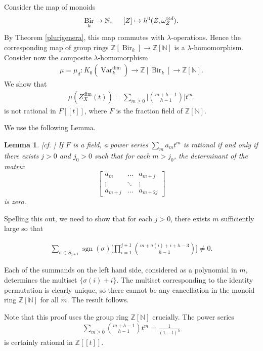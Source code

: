 \documentclass{amsart}
\newtheorem{lem}[thm]{Lemma}
\theoremstyle{definition}
\DeclareMathOperator{\sgn}{sgn}
\DeclareMathOperator{\Bir}{Bir}
\DeclareMathOperator{\Var}{Var}
\numberwithin{equation}{section}
\begin{document}
Consider the map of monoids 
\begin{align*}
   \Bir_k \rightarrow \mathbb{N}, \hspace{.5cm} [Z] \mapsto h^0(Z, \omega_Z^{\otimes d}).
\end{align*}
By Theorem \ref{plurigenera}, this map commutes with $\lambda$-operations. Hence the corresponding map of group rings $\mathbb{Z}[\Bir_k] \rightarrow \mathbb{Z}[\mathbb{N}]$ is a $\lambda$-homomorphism. Consider now the composite $\lambda$-homomorphism
\begin{align*}
\mu = \mu_d: K_0(\Var_k^{\dim}) \rightarrow \mathbb{Z}[\Bir_k] \rightarrow \mathbb{Z}[\mathbb{N}].
\end{align*}
We show that
\begin{align*}
    \mu(Z_X^{\dim}(t)) = \sum_{m \geq 0} \bigg[ \binom{m+h-1}{h-1} \bigg] t^m.
\end{align*}
is not rational in $F[[t]]$, where $F$ is the fraction field of $\mathbb{Z}[\mathbb{N}]$.

We use the following Lemma.

\begin{lem}\label{a}[cf. \cite[Section $3$]{larsenluntsstable}]
If $F$ is a field, a power series $\sum_m a_m t^m$ is rational if and only if there exists $j>0$ and $j_0>0$ such that for each $m>j_0$, the determinant of the matrix
\[
\begin{bmatrix} 
a_{m} & \dots  & a_{m+j}\\
\vdots & \ddots & \vdots\\
a_{m+j} & \dots  & a_{m+2j} 
\end{bmatrix}
\]
is zero.
\end{lem}

Spelling this out, we need to show that for each $j>0$, there exists $m$ sufficiently large so that

\begin{align*}
\sum_{\sigma \in S_{j+1}} \sgn(\sigma) \bigg[  \prod_{i=1}^{j+1} \binom{m+\sigma(i)+i+h-3}{h-1} \bigg] \neq 0.
\end{align*}

Each of the summands on the left hand side, considered as a polynomial in $m$, determines the multiset $\{ \sigma(i) + i \}$. The multiset corresponding to the identity permutation is clearly unique, so there cannot be any cancellation in the monoid ring $\mathbb{Z}[\mathbb{N}]$ for all $m$. The result follows.

Note that this proof uses the group ring $\mathbb{Z}[\mathbb{N}]$ crucially. The power series
\begin{align*}
    \sum_{m \geq 0} \binom{m+h-1}{h-1} t^m = \frac{1}{(1-t)^h}
\end{align*}
is certainly rational in $\mathbb{Z}[[t]]$.
\end{document}
